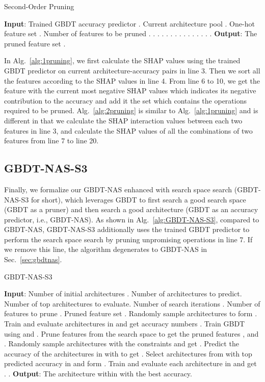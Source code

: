 \documentclass{article}
\begin{document}
\begin{algorithm}[!h]
\small
\caption{Second-Order Pruning}
\label{alg:2pruning}
\begin{algorithmic}[1]
\STATE \textbf{Input}: Trained GBDT accuracy predictor . Current architecture pool . One-hot feature set . Number of features to be pruned .
\STATE .
\STATE .
\STATE .
\STATE {}   .
\FOR {}
\STATE .
\STATE .
\STATE .
\STATE .
\STATE .
\STATE .
\STATE .
\IF{}
\STATE .
\ELSIF{}
\STATE .
\ELSIF{}
\STATE .
\ENDIF
\ENDFOR
\STATE \textbf{Output}: The pruned feature set .
\end{algorithmic}
\end{algorithm}

In Alg.~\ref{alg:1pruning}, we first calculate the SHAP values using the trained GBDT predictor  on current architecture-accuracy pairs  in line 3. Then we sort all the features according to the SHAP values in line 4. From line 6 to 10, we get the feature  with the current most negative SHAP values which indicates its negative contribution to the accuracy and add it the set  which contains the operations required to be pruned. Alg.~\ref{alg:2pruning} is similar to Alg.~\ref{alg:1pruning} and is different in that we calculate the SHAP interaction values between each two features in line 3, and calculate the SHAP values of all the combinations of two features from line 7 to line 20.

\subsection{GBDT-NAS-S3}
Finally, we formalize our GBDT-NAS enhanced with search space search (GBDT-NAS-S3 for short), which leverages GBDT to first search a good search space (GBDT as a pruner) and then search a good architecture (GBDT as an accuracy predictor, i.e., GBDT-NAS). As shown in Alg.~\ref{alg:GBDT-NAS-S3}, compared to GBDT-NAS, GBDT-NAS-S3 additionally uses the trained GBDT predictor  to perform the search space search by pruning unpromising operations in line 7. If we remove this line, the algorithm degenerates to GBDT-NAS in Sec.~\ref{sec:gbdtnas}.

\begin{algorithm}[ht]
\small
\caption{GBDT-NAS-S3}
\label{alg:GBDT-NAS-S3}
\begin{algorithmic}[1]
\STATE \textbf{Input}: Number of initial architectures . Number of architectures  to predict. Number of top architectures  to evaluate. Number of search iterations . Number of features to prune .
\STATE Pruned feature set .
\STATE Randomly sample  architectures to form .
\STATE Train and evaluate architectures in  and get accuracy numbers .
\FOR {}
\STATE Train GBDT  using  and .
\STATE Prune  features from the search space to get the pruned features , and .
\STATE Randomly sample  architectures with the constraints  and get .
\STATE Predict the accuracy of the architectures in  with  to get .
\STATE Select architectures from  with top  predicted accuracy in  and form .
\STATE Train and evaluate each architecture in  and get .
\STATE .
\ENDFOR
\STATE \textbf{Output}: The architecture within  with the best accuracy.
\end{algorithmic}
\end{algorithm}
\end{document}

